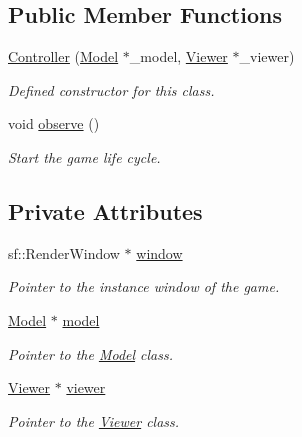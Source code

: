 \subsection*{Public Member Functions}
\begin{DoxyCompactItemize}
\item 
\hyperlink{class_controller_ae2231c787d852af79c95433cf30cbe9f}{Controller} (\hyperlink{class_model}{Model} $\ast$\+\_\+model, \hyperlink{class_viewer}{Viewer} $\ast$\+\_\+viewer)
\begin{DoxyCompactList}\small\item\em Defined constructor for this class. \end{DoxyCompactList}\item 
\mbox{\label{class_controller_a6ebc30e3213a87318b8f6d7c7f2edc7c}} 
void \hyperlink{class_controller_a6ebc30e3213a87318b8f6d7c7f2edc7c}{observe} ()
\begin{DoxyCompactList}\small\item\em Start the game life cycle. \end{DoxyCompactList}\end{DoxyCompactItemize}
\subsection*{Private Attributes}
\begin{DoxyCompactItemize}
\item 
\mbox{\label{class_controller_a9c31118fa8ad5b061deae97b57fadbec}} 
sf\+::\+Render\+Window $\ast$ \hyperlink{class_controller_a9c31118fa8ad5b061deae97b57fadbec}{window}
\begin{DoxyCompactList}\small\item\em Pointer to the instance window of the game. \end{DoxyCompactList}\item 
\mbox{\label{class_controller_a6f6ea54052742d3940adfcfce885bae9}} 
\hyperlink{class_model}{Model} $\ast$ \hyperlink{class_controller_a6f6ea54052742d3940adfcfce885bae9}{model}
\begin{DoxyCompactList}\small\item\em Pointer to the \hyperlink{class_model}{Model} class. \end{DoxyCompactList}\item 
\mbox{\label{class_controller_a81f966e6dcf07b90a15453ee54945182}} 
\hyperlink{class_viewer}{Viewer} $\ast$ \hyperlink{class_controller_a81f966e6dcf07b90a15453ee54945182}{viewer}
\begin{DoxyCompactList}\small\item\em Pointer to the \hyperlink{class_viewer}{Viewer} class. \end{DoxyCompactList}\end{DoxyCompactItemize}


